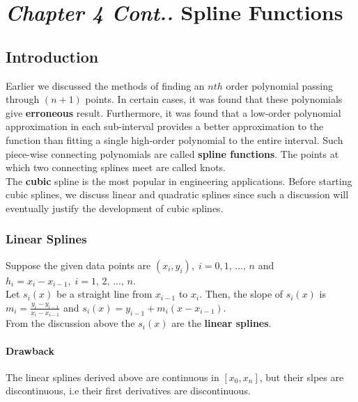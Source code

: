 \documentclass[aima203_lecturenotes_ku.tex]{subfiles}
\begin{document}
\chapter*{\textit{Chapter 4 Cont..} \hspace{15mm}  Spline Functions}
\section{Introduction}
Earlier we discussed the methods of finding an $nth$ order polynomial passing through $(n+1)$ points. In certain cases, it was found that these polynomials give \textbf{erroneous} result. Furthermore, it was found that a low-order polynomial approximation in each sub-interval provides a better approximation to the function than fitting a single high-order polynomial to the entire interval.
Such piece-wise connecting polynomials are called \textbf{spline functions}. The points at which two connecting splines meet are called knots.\\
The \textbf{cubic} spline is the most popular in engineering applications. Before starting cubic splines, we discuss linear and quadratic splines since such a discussion will eventually justify the development of cubic splines.

\subsection{Linear Splines}
Suppose the given data points are $(x_i,y_i), \; i=0,1,\, ..., \, n$ and  $h_i = x_i-x_{i-1} , \; i=1,\, 2, \, ..., \, n$. \\
Let $s_i(x)$ be a straight line from $x_{i-1}$ to $x_i$. Then, the slope of $s_i(x)$ is \\
$\displaystyle m_i = \frac{y_i - y_{i-1}}{x_i - x_{i-1}}$ and $s_i(x)= y_{i-1} + m_i(x-x_{i-1})$. \\[2mm]
From the discussion above the $s_i(x)$ are the \textbf{linear splines}.

\subsubsection{Drawback}
The linear splines derived above are continuous in $[x_0, x_n]$, but their slpes are discontinuous, i.e their first derivatives are discontinuous.
\end{document}
